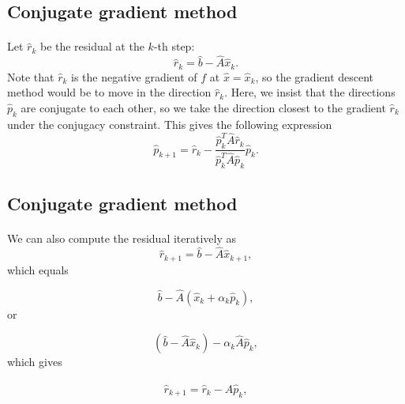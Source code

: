 \documentclass[%
twoside,                 %
final,                   %
10pt]{article}
\begin{document}
\subsection*{Conjugate gradient method}

\paragraph{}
Let  $\hat{r}_k$ be the residual at the $k$-th step:
\begin{equation*}
\hat{r}_k=\hat{b}-\hat{A}\hat{x}_k.
\end{equation*}
Note that $\hat{r}_k$ is the negative gradient of $f$ at 
$\hat{x}=\hat{x}_k$, 
so the gradient descent method would be to move in the direction $\hat{r}_k$. 
Here, we insist that the directions $\hat{p}_k$ are conjugate to each other, 
so we take the direction closest to the gradient $\hat{r}_k$  
under the conjugacy constraint. 
This gives the following expression
\begin{equation*}
\hat{p}_{k+1}=\hat{r}_k-\frac{\hat{p}_k^T \hat{A}\hat{r}_k}{\hat{p}_k^T\hat{A}\hat{p}_k} \hat{p}_k.
\end{equation*}



\subsection*{Conjugate gradient method}

\paragraph{}
We can also  compute the residual iteratively as
\begin{equation*}
\hat{r}_{k+1}=\hat{b}-\hat{A}\hat{x}_{k+1},
 \end{equation*}
which equals

\begin{equation*}
\hat{b}-\hat{A}(\hat{x}_k+\alpha_k\hat{p}_k),
 \end{equation*}
or

\begin{equation*}
(\hat{b}-\hat{A}\hat{x}_k)-\alpha_k\hat{A}\hat{p}_k,
 \end{equation*}
which gives

\begin{equation*}
\hat{r}_{k+1}=\hat{r}_k-\hat{A}\hat{p}_{k},
 \end{equation*}
\end{document}

